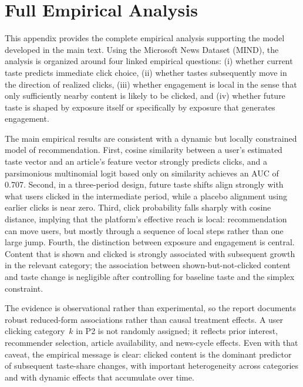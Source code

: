\documentclass[11pt]{article}
\begin{document}
\appendix

\section{Full Empirical Analysis}\label{sec:appendix_empirical}

This appendix provides the complete empirical analysis supporting the model developed in the main text. Using the Microsoft News Dataset (MIND), the analysis is organized around four linked empirical questions: (i) whether current taste predicts immediate click choice, (ii) whether tastes subsequently move in the direction of realized clicks, (iii) whether engagement is local in the sense that only sufficiently nearby content is likely to be clicked, and (iv) whether future taste is shaped by exposure itself or specifically by exposure that generates engagement.

The main empirical results are consistent with a dynamic but locally constrained model of recommendation. First, cosine similarity between a user's estimated taste vector and an article's feature vector strongly predicts clicks, and a parsimonious multinomial logit based only on similarity achieves an AUC of 0.707. Second, in a three-period design, future taste shifts align strongly with what users clicked in the intermediate period, while a placebo alignment using earlier clicks is near zero. Third, click probability falls sharply with cosine distance, implying that the platform's effective reach is local: recommendation can move users, but mostly through a sequence of local steps rather than one large jump. Fourth, the distinction between exposure and engagement is central. Content that is shown and clicked is strongly associated with subsequent growth in the relevant category; the association between shown-but-not-clicked content and taste change is negligible after controlling for baseline taste and the simplex constraint.

The evidence is observational rather than experimental, so the report documents robust reduced-form associations rather than causal treatment effects. A user clicking category~$k$ in P2 is not randomly assigned; it reflects prior interest, recommender selection, article availability, and news-cycle effects. Even with that caveat, the empirical message is clear: clicked content is the dominant predictor of subsequent taste-share changes, with important heterogeneity across categories and with dynamic effects that accumulate over time.
\end{document}
